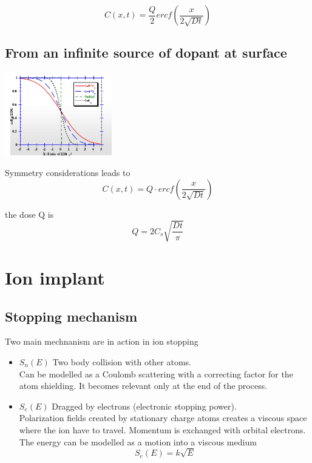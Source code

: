 \begin{equation}
C(x,t)=\frac{Q}{2}ercf\left(\frac{x}{2\sqrt{Dt}}\right)
\end{equation}


\subsection{From an infinite source of dopant at surface}

\centering
\includegraphics[width=0.35\textwidth]{inf_surf.png}\\
\raggedright

Symmetry considerations leads to 
\begin{equation}
C(x,t)=Q\cdot ercf\left(\frac{x}{2\sqrt{Dt}}\right)
\end{equation}

the dose Q is 
\begin{equation}
Q=2C_s \sqrt{\frac{Dt}{\pi}}
\end{equation}





\section{Ion implant}

\subsection{Stopping mechanism}
Two main mechnanism are in action in ion stopping 

\begin{itemize}
\item $S_n(E)$ Two body collision with other atoms.\\
Can be modelled as a Coulomb scattering with a correcting factor for the atom shielding. It becomes relevant only at the end of the process.\\
 
\item $S_e(E)$ Dragged by electrons (electronic stopping power).\\
Polarization fields created by stationary charge atoms creates a viscous space where the ion have to travel. Momentum is exchanged with orbital electrons.\\ 
The energy can be modelled as a motion into a viscous medium
\begin{equation}
S_e(E)=k\sqrt{E}
\end{equation}

\end{itemize}

